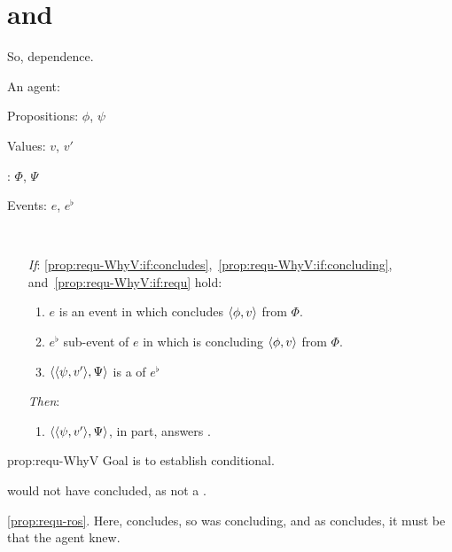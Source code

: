 \section{ and \qWhyV{}}

\begin{note}
  \questionWhyV*

  So, dependence.

  \begin{proposition}
    \label{prop:requ-WhyV}
    \begin{itemize*}[noitemsep, label=\(\circ\)]
    \item
      An agent: \vAgent{}
    \item
      Propositions: \(\phi\), \(\psi\)
    \item
      Values: \(v\), \(v'\)
    \item
      : \(\Phi\), \(\Psi\)
    \item
      Events: \(e\), \(e^{\flat}\)
    \item
      \mbox{ }
    \end{itemize*}

    \begin{itemize}
    \item[\emph{If}:]
      \ref{prop:requ-WhyV:if:concludes},~\ref{prop:requ-WhyV:if:concluding}, and~\ref{prop:requ-WhyV:if:requ} hold:
      \begin{enumerate}[label=\alph*., ref=(\alph*), series=propRequWhyVSeries]
      \item
        \label{prop:requ-WhyV:if:concludes}
        \(e\) is an event in which \vAgent{} concludes \(\langle \phi, v \rangle\) from \(\Phi\).
      \item
        \label{prop:requ-WhyV:if:concluding}
        \(e^{\flat}\) sub-event of \(e\) in which \vAgent{} is concluding \(\langle \phi, v \rangle\) from \(\Phi\).
      \item
        \label{prop:requ-WhyV:if:requ}
        \(\langle \langle \psi, v' \rangle, \Psi \rangle\) is a \requ{} of \(e^{\flat}\)
      \end{enumerate}
    \item[\emph{Then}:]
      \begin{enumerate}[label=\alph*., ref=(\alph*), resume*=propRequWhyVSeries]
      \item
        \label{prop:requ-WhyV:tn:answer}
        \(\langle \langle \psi, v' \rangle, \Psi \rangle\), in part, answers \qWhyV{}.
      \end{enumerate}
    \end{itemize}
    \vspace{-\baselineskip}
  \end{proposition}

  \begin{argument}{prop:requ-WhyV}
    Goal is to establish conditional.

    \vAgent{} would not have concluded, as not a .
  \end{argument}

  \autoref{prop:requ-ros}.
  Here, concludes, so was concluding, and as concludes, it must be that the agent knew.
\end{note}

